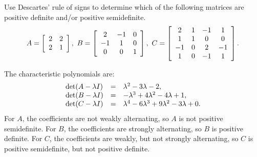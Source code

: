 \documentclass{ximera}
\begin{document}
\begin{problem}
  Use Descartes' rule of signs to determine which of the following
  matrices are positive definite and/or positive semidefinite.
  \begin{equation*}
    A = \startmat{cc}
      2 & 2 \\
      2 & 1 \\
    \stopmat,
    \quad
    B = \startmat{ccc}
      2  & -1 & 0 \\
      -1 &  1 & 0 \\
      0  &  0 & 1 \\
    \stopmat,
    \quad
    C = \startmat{cccc}
      2  & 1 & -1 &  1 \\
      1  & 1 &  0 &  0 \\
      -1 & 0 &  2 & -1 \\
      1  & 0 & -1 &  1 \\
    \stopmat.
  \end{equation*}
  \begin{solution}
    The characteristic polynomials are:
    \begin{equation*}
      \begin{array}{lcl}
        \det(A-\eigenvar I) &=& \eigenvar^2 - 3\eigenvar - 2, \\
        \det(B-\eigenvar I) &=& -\eigenvar^3 + 4\eigenvar^2 - 4\eigenvar + 1, \\
        \det(C-\eigenvar I) &=& \eigenvar^4 - 6\eigenvar^3 + 9\eigenvar^2 - 3\eigenvar + 0.
      \end{array}
    \end{equation*}
    For $A$, the coefficients are not weakly alternating, so $A$ is
    not positive semidefinite. For $B$, the coefficients are strongly
    alternating, so $B$ is positive definite. For $C$, the
    coefficients are weakly, but not strongly alternating, so $C$ is
    positive semidefinite, but not positive definite.
  \end{solution}
\end{problem}
\end{document}
